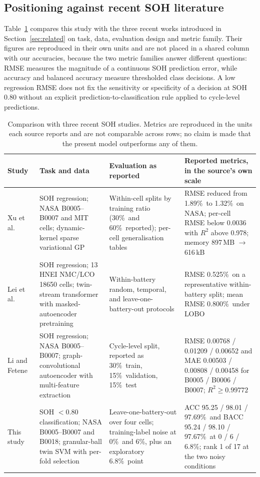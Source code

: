 \documentclass[final,5p,times,twocolumn]{elsarticle}
\newcommand{\nz}{\%}
\begin{document}
\subsection{Positioning against recent SOH literature}\label{sec:lit}
Table~\ref{tab:sota} compares this study with the three recent works introduced in Section~\ref{sec:related} on task, data, evaluation design and metric family. Their figures are reproduced in their own units and are not placed in a shared column with our accuracies, because the two metric families answer different questions: RMSE measures the magnitude of a continuous SOH prediction error, while accuracy and balanced accuracy measure thresholded class decisions. A low regression RMSE does not fix the sensitivity or specificity of a decision at SOH 0.80 without an explicit prediction-to-classification rule applied to cycle-level predictions.
\begin{table}[!t]\centering\scriptsize\caption{Comparison with three recent SOH studies. Metrics are reproduced in the units each source reports and are not comparable across rows; no claim is made that the present model outperforms any of them.}\label{tab:sota}
\begin{tabularx}{\textwidth}{>{\raggedright\arraybackslash}p{2.0cm} >{\raggedright\arraybackslash}p{2.9cm} X X}\toprule
Study&Task and data&Evaluation as reported&Reported metrics, in the source's own scale\\\midrule
Xu et al.~\cite{xu2026}&SOH regression; NASA B0005--B0007 and MIT cells; dynamic-kernel sparse variational GP&Within-cell splits by training ratio (30\nz\ and 60\nz\ reported); per-cell generalisation tables&RMSE reduced from 1.89\nz\ to 1.32\nz\ on NASA; per-cell RMSE below 0.0036 with $R^2$ above 0.978; memory 897\,MB $\rightarrow$ 616\,kB\\[2pt]
Lei et al.~\cite{lei2027}&SOH regression; 13 HNEI NMC/LCO 18650 cells; twin-stream transformer with masked-autoencoder pretraining&Within-battery random, temporal, and leave-one-battery-out protocols&RMSE 0.525\nz\ on a representative within-battery split; mean RMSE 0.800\nz\ under LOBO\\[2pt]
Li and Fetene~\cite{lifetene2027}&SOH regression; NASA B0005--B0007; graph-convolutional autoencoder with multi-feature extraction&Cycle-level split, reported as 30\nz\ train, 15\nz\ validation, 15\nz\ test&RMSE 0.00768 / 0.01209 / 0.00652 and MAE 0.00503 / 0.00808 / 0.00458 for B0005 / B0006 / B0007; $R^2\ge0.99772$\\[2pt]
\rowcolor{proposedrow} This study&SOH $<0.80$ classification; NASA B0005--B0007 and B0018; granular-ball twin SVM with per-fold selection&Leave-one-battery-out over four cells; training-label noise at 0\nz\ and 6\nz, plus an exploratory 6.8\nz\ point&ACC 95.25 / 98.01 / 97.69\nz\ and BACC 95.24 / 98.10 / 97.67\nz\ at 0 / 6 / 6.8\nz; rank 1 of 17 at the two noisy conditions\\\bottomrule\end{tabularx}\end{table}
\end{document}

